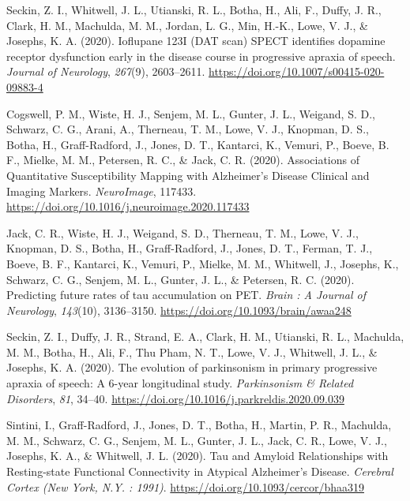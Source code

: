 \documentclass[11pt, a4paper]{awesome-cv}
\begin{document}
\leavevmode\hypertarget{ref-seckin_ioflupane_2020}{}%
Seckin, Z. I., Whitwell, J. L., Utianski, R. L., Botha, H., Ali, F.,
Duffy, J. R., Clark, H. M., Machulda, M. M., Jordan, L. G., Min, H.-K.,
Lowe, V. J., \& Josephs, K. A. (2020). Ioflupane {123I} ({DAT} scan)
{SPECT} identifies dopamine receptor dysfunction early in the disease
course in progressive apraxia of speech. \emph{Journal of Neurology},
\emph{267}(9), 2603--2611.
\url{https://doi.org/10.1007/s00415-020-09883-4}

\leavevmode\hypertarget{ref-cogswell_associations_2020}{}%
Cogswell, P. M., Wiste, H. J., Senjem, M. L., Gunter, J. L., Weigand, S.
D., Schwarz, C. G., Arani, A., Therneau, T. M., Lowe, V. J., Knopman, D.
S., Botha, H., Graff-Radford, J., Jones, D. T., Kantarci, K., Vemuri,
P., Boeve, B. F., Mielke, M. M., Petersen, R. C., \& Jack, C. R. (2020).
Associations of {Quantitative} {Susceptibility} {Mapping} with
{Alzheimer}'s {Disease} {Clinical} and {Imaging} {Markers}.
\emph{NeuroImage}, 117433.
\url{https://doi.org/10.1016/j.neuroimage.2020.117433}

\leavevmode\hypertarget{ref-jack_predicting_2020}{}%
Jack, C. R., Wiste, H. J., Weigand, S. D., Therneau, T. M., Lowe, V. J.,
Knopman, D. S., Botha, H., Graff-Radford, J., Jones, D. T., Ferman, T.
J., Boeve, B. F., Kantarci, K., Vemuri, P., Mielke, M. M., Whitwell, J.,
Josephs, K., Schwarz, C. G., Senjem, M. L., Gunter, J. L., \& Petersen,
R. C. (2020). Predicting future rates of tau accumulation on {PET}.
\emph{Brain : A Journal of Neurology}, \emph{143}(10), 3136--3150.
\url{https://doi.org/10.1093/brain/awaa248}

\leavevmode\hypertarget{ref-seckin_evolution_2020}{}%
Seckin, Z. I., Duffy, J. R., Strand, E. A., Clark, H. M., Utianski, R.
L., Machulda, M. M., Botha, H., Ali, F., Thu Pham, N. T., Lowe, V. J.,
Whitwell, J. L., \& Josephs, K. A. (2020). The evolution of parkinsonism
in primary progressive apraxia of speech: {A} 6-year longitudinal study.
\emph{Parkinsonism \& Related Disorders}, \emph{81}, 34--40.
\url{https://doi.org/10.1016/j.parkreldis.2020.09.039}

\leavevmode\hypertarget{ref-sintini_tau_2020}{}%
Sintini, I., Graff-Radford, J., Jones, D. T., Botha, H., Martin, P. R.,
Machulda, M. M., Schwarz, C. G., Senjem, M. L., Gunter, J. L., Jack, C.
R., Lowe, V. J., Josephs, K. A., \& Whitwell, J. L. (2020). Tau and
{Amyloid} {Relationships} with {Resting}-state {Functional}
{Connectivity} in {Atypical} {Alzheimer}'s {Disease}. \emph{Cerebral
Cortex (New York, N.Y. : 1991)}.
\url{https://doi.org/10.1093/cercor/bhaa319}
\end{document}
